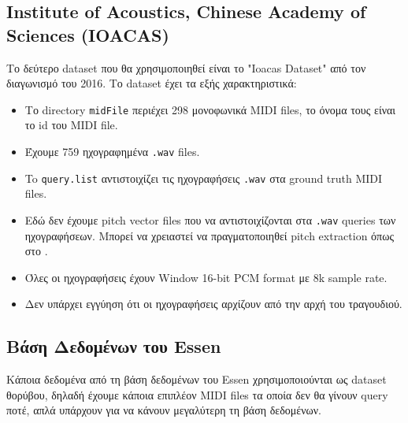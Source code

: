 \subsection{Institute of Acoustics, Chinese Academy of Sciences (IOACAS)}
Το δεύτερο dataset που θα χρησιμοποιηθεί είναι το "Ioacas Dataset" \cite{IOACAS-dataset} από τον διαγωνισμό του 2016. Το dataset έχει τα εξής χαρακτηριστικά:
\begin{itemize}
\item Το directory \texttt{midFile} περιέχει 298 μονοφωνικά MIDI files, το όνομα τους είναι το id του MIDI file.
\item Έχουμε 759 ηχογραφημένα \texttt{.wav} files.
\item To \texttt{query.list} αντιστοιχίζει τις ηχογραφήσεις \texttt{.wav} στα ground truth MIDI files.
\item Εδώ δεν έχουμε pitch vector files που να αντιστοιχίζονται στα \texttt{.wav} queries των ηχογραφήσεων.
Μπορεί να χρειαστεί να πραγματοποιηθεί pitch extraction όπως στο \cite{park2015query}.
\item Όλες οι ηχογραφήσεις έχουν Window 16-bit PCM format με 8k sample rate.
\item Δεν υπάρχει εγγύηση ότι οι ηχογραφήσεις αρχίζουν από την αρχή του τραγουδιού.
\end{itemize}

\subsection{Βάση Δεδομένων του Essen}
Κάποια δεδομένα από τη βάση δεδομένων του Essen\cite{esac-dataset} χρησιμοποιούνται
 ως dataset θορύβου, δηλαδή έχουμε κάποια επιπλέον MIDI files τα οποία δεν θα
 γίνουν query ποτέ, απλά υπάρχουν για να κάνουν μεγαλύτερη τη βάση δεδομένων.
